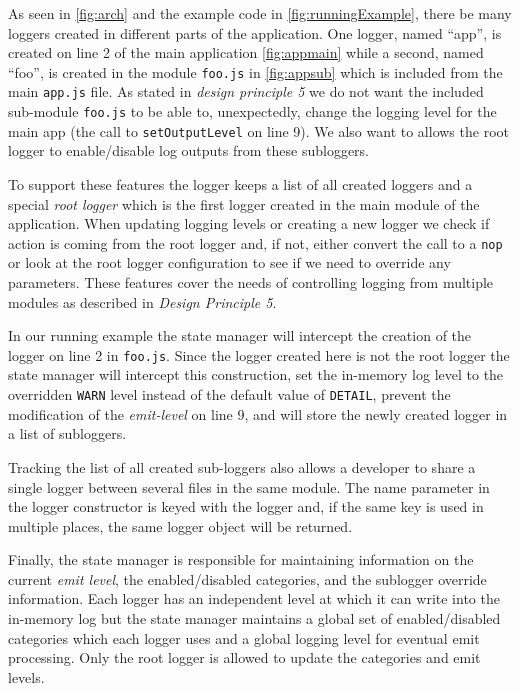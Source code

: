 As seen in \autoref{fig:arch} and the example code in \autoref{fig:runningExample}, there be many loggers 
created in different parts of the application. One logger, named ``app'', is created on line 
2 of the main application \autoref{fig:appmain} while a second, named ``foo'', is created 
in the module \texttt{foo.js} in \autoref{fig:appsub} which is included from 
the main \texttt{app.js} file. As stated in \emph{design principle 5} we 
do not want the included sub-module \texttt{foo.js} to be able to, unexpectedly, 
change the logging level for the main app (the call to \texttt{setOutputLevel} on 
line 9). We also want to allows the root logger to enable/disable log outputs 
from these subloggers. 

To support these features the \projn logger keeps a list of all created loggers 
and a special \emph{root logger} which is the first logger created in the main 
module of the application. When updating logging levels or creating a new logger 
we check if action is coming from the root logger and, if not, either convert 
the call to a \texttt{nop} or look at the root logger configuration to see if 
we need to override any parameters. These features cover the needs of controlling 
logging from multiple modules as described in \emph{Design Principle 5}.

In our running example the state manager will intercept the creation of the logger 
on line 2 in \texttt{foo.js}. Since the logger created here is not the root logger
the state manager will intercept this construction, set the in-memory log level to 
the overridden \texttt{WARN} level instead of the default value of \texttt{DETAIL}, 
prevent the modification of the \emph{emit-level} on line 9, and will 
store the newly created logger in a list of subloggers. 

Tracking the list of all created sub-loggers also allows a developer to share a 
single logger between several files in the same module. The name parameter in the 
logger constructor is keyed with the logger and, if the same key is used in multiple 
places, the same logger object will be returned.

Finally, the state manager is responsible for maintaining information on the current 
\emph{emit level}, the enabled/disabled categories, and the sublogger override information. 
Each logger has an independent level at which it can write into the in-memory log but 
the state manager maintains a global set of enabled/disabled categories which each logger 
uses and a global logging level for eventual emit processing. Only the root logger is 
allowed to update the categories and emit levels. 

